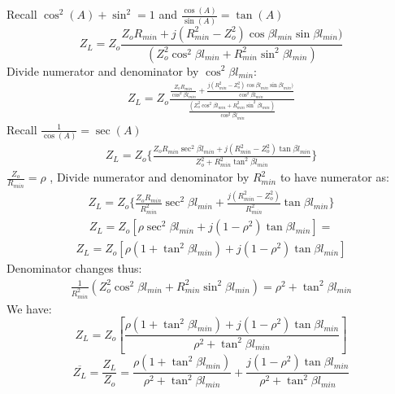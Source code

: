 Recall $ \cos^{2}(A) + \sin^{2} = 1 $ and $ \frac{\cos(A)}{\sin(A)} = \tan(A) $
\begin{dmath}
Z_{L} = Z_o\frac{Z_oR_{min} + j(R_{min}^{2}-Z_o^{2})\cos\beta l_{min}\sin\beta l_{min})}{(Z_o^{2}\cos^{2}\beta l_{min} + R_{min}^{2}\sin^{2}\beta l_{min})}
\end{dmath}
Divide numerator and denominator by $\cos^{2}\beta l_{min}$:
\begin{align*}
Z_{L} = Z_o\frac{\frac{Z_oR_{min}}{\cos^{2}\beta l_{min}} + \frac{j(R_{min}^{2}-Z_o^{2})\cos\beta l_{min}\sin\beta l_{min})}{\cos^{2}\beta l_{min}}}{\frac{(Z_o^{2}\cos^{2}\beta l_{min} + R_{min}^{2}\sin^{2}\beta l_{min})}{\cos^{2}\beta l_{min}}}
\end{align*}
Recall $ \frac{1}{\cos(A)} = \sec(A) $
\begin{align}
Z_{L} = Z_o\{\frac{Z_oR_{min}\sec^{2}\beta l_{min} + j(R_{min}^{2}-Z_o^{2})\tan\beta l_{min}}{Z_o^{2}+ R_{min}^{2}\tan^{2}\beta l_{min}}\}
\end{align}
$\frac{Z_o}{R_{min}} = \rho$ , Divide numerator and denominator by $R_{min}^{2}$ to have numerator as:
\begin{align*}
Z_{L} = Z_o\{\frac{Z_oR_{min}}{R_{min}^{2}}\sec^{2}\beta l_{min} + \frac{j(R_{min}^{2}-Z_o^{2})}{{R_{min}^{2}}}\tan\beta l_{min}\}
\end{align*}
\begin{align*}
Z_{L} = Z_o [\rho \sec^{2}\beta l_{min} + j(1-\rho^{2})\tan\beta l_{min}] =
\end{align*}
\begin{align*}
Z_{L} = Z_o [ \rho (1 + \tan^{2}\beta l_{min}) + j(1-\rho^{2})\tan\beta l_{min}]
\end{align*}
Denominator changes thus:
\begin{align*}
\frac{1}{R_{min}^{2}}{(Z_o^{2}\cos^{2}\beta l_{min} + R_{min}^{2}\sin^{2}\beta l_{min})} = \rho^{2} + \tan^{2}\beta l_{min}
\end{align*}
We have:
{\footnotesize
\begin{dmath}
Z_{L} = Z_o \left[\frac{\rho (1 + \tan^{2}\beta l_{min}) + j(1-\rho^{2})\tan\beta l_{min}}{\rho^{2} + \tan^{2}\beta l_{min}} \right]
\end{dmath}}
\begin{dmath*}
\overline{Z_{L}} = \frac{Z_{L}}{Z_o} =  \frac{\rho (1 + \tan^{2}\beta l_{min})}{\rho^{2} + \tan^{2}\beta l_{min}} + \frac{j(1-\rho^{2})\tan\beta l_{min}}{\rho^{2} + \tan^{2}\beta l_{min}}
\end{dmath*}


